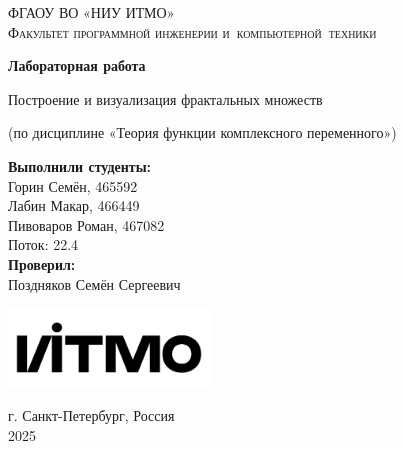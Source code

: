 \begin{titlepage}
    \begin{center}
        \large
        \textsc{ФГАОУ ВО «НИУ ИТМО»\\
        Факультет программной инженерии и~компьютерной~техники}
        \vspace*{4cm}
            
        \Huge
        \textbf{Лабораторная работа}
            
        \vspace{0.5cm}
        \LARGE
        Построение и визуализация фрактальных множеств
            
        \vspace{0.5cm}
        \large
        (по дисциплине «Теория функции комплексного переменного»)

        \vspace{1.5cm}

        \hfill\large
        \begin{minipage}{.5\textwidth}
        \textbf{Выполнили студенты:}\\[2mm]
        Горин Семён, 465592\\
        Лабин Макар, 466449\\
        Пивоваров Роман, 467082\\
        Поток: 22.4\\[2mm]
        \textbf{Проверил:}\\[2mm]
        Поздняков Семён Сергеевич
        \end{minipage}%
            
        \vfill
            
        \vspace{0.8cm}
            
        \includegraphics[width=0.4\textwidth]{itmo}
            
        \Large
        г. Санкт-Петербург, Россия\\
        2025
            
    \end{center}
\end{titlepage}